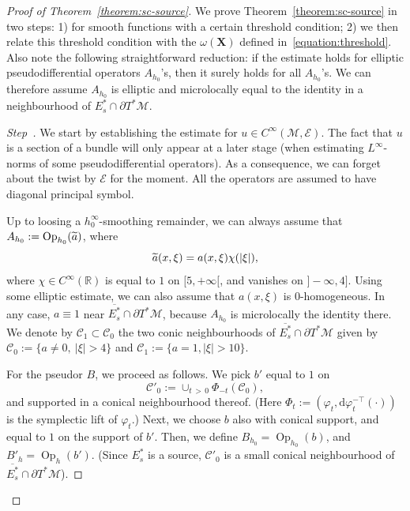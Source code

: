 \documentclass[AHL,Unicode,longabstracts,published]{cedram}
\newcommand{\R}{\mathbb{R}}
\newcommand{\X}{\mathbf{X}}
\newcommand{\M}{\mathcal{M}}
\newcommand{\E}{\mathcal{E}}
\newcommand{\clC}{\mathcal{C}}
\newcommand{\dd}{\mathrm{d}}
\DeclareMathOperator{\Op}{Op}
\newcounter{stepcount}
\newenvironment{step}{\refstepcounter{stepcount}\begin{proof}[Step~\thestepcount]}{\let\qed\relax\end{proof}}
\let\oldtilde\tilde
\renewcommand*{\tilde}[1]{\mathchoice{\widetilde{#1}}{\widetilde{#1}}{\oldtilde{#1}}{\oldtilde{#1}}}
\begin{document}
\begin{proof}[Proof of Theorem~\ref{theorem:sc-source}] We prove Theorem~\ref{theorem:sc-source} in two steps: 1) for smooth functions with a certain threshold condition; 2) we then relate this threshold condition with the $\omega(\X)$ defined in~\eqref{equation:threshold}. Also note the following straightforward reduction: if the estimate holds for elliptic pseudodifferential operators $A_{h_0}$'s, then it surely holds for all $A_{h_0}$'s. We can therefore assume $A_{h_0}$ is elliptic and microlocally equal to the identity in a neighbourhood of $E_s^* \cap \partial T^*\M$.

\begin{step}
We start by establishing the estimate for $u\in C^\infty(\M,\E)$. The fact that $u$ is a section of a bundle will only appear at a later stage (when estimating $L^\infty$-norms of some pseudodifferential operators). As a consequence, we can forget about the twist by $\E$ for the moment. All the operators are assumed to have diagonal principal symbol.

Up to loosing a $h_0^\infty$-smoothing remainder, we can always assume that $A_{h_0}:=\Op_{h_0}(\tilde{a})$, where
\[
\tilde{a}(x,\xi) = a(x,\xi) \chi(|\xi|),
\]
where $\chi\in C^\infty(\R)$ is equal to $1$ on $[5,+\infty[$, and vanishes on $]-\infty, 4]$. Using some elliptic estimate, we can also assume that $a(x,\xi)$ is $0$-homogeneous. In any case, $a \equiv 1$ near $\overline{E^*_s}\cap \partial T^*\M$, because $A_{h_0}$ is microlocally the identity there. We denote by $\clC_1 \subset \clC_0$ the two conic neighbourhoods of $\overline{E^\ast_s}\cap \partial T^\ast \M$ given by $\clC_0:=\{ a \neq 0,\ |\xi|>4\}$ and $\clC_1:=\{ a = 1,|\xi|>10\}$.

For the pseudor $B$, we proceed as follows. We pick $b'$ equal to $1$ on
\[
\clC'_0 := \cup_{t\,>\,0} \Phi_{-t}(\clC_0),
\]
and supported in a conical neighbourhood thereof. (Here $\Phi_t := (\varphi_t, \dd \varphi_t^{-\top}(\cdot))$ is the symplectic lift of $\varphi_t$.) Next, we choose $b$ also with conical support, and equal to $1$ on the support of $b'$. Then, we define $B_{h_0}= \Op_{h_0}(b)$, and $B'_h= \Op_h(b')$. (Since $E^\ast_s$ is a source, $\clC'_0$ is a small conical neighbourhood of $\overline{E^\ast_s}\cap \partial T^\ast \M$).


\end{step}
\end{proof}
\end{document}
